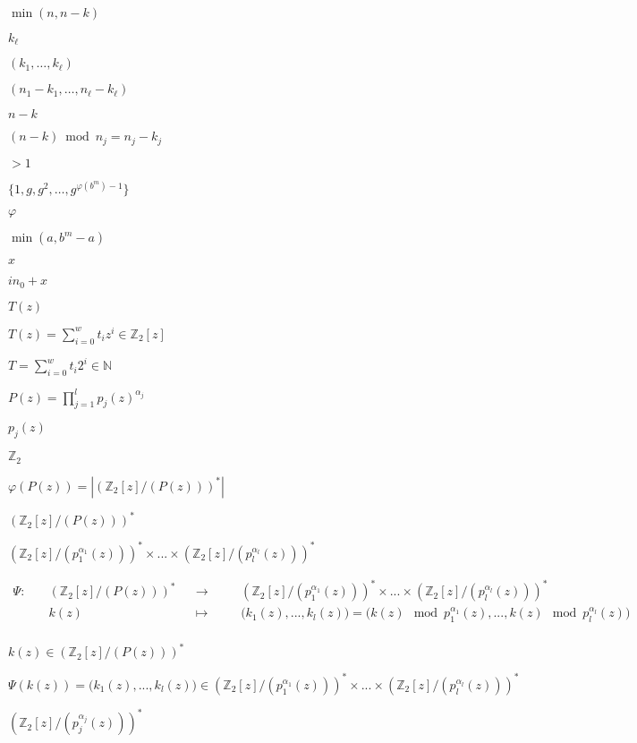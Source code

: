 \documentclass{article}
\begin{document}
$\min(n,n-k)$
\pagebreak

$k_\ell$
\pagebreak

$(k_1,
 \dots, k_\ell)$
\pagebreak

$(n_1 - k_1, \dots, n_\ell -
 k_\ell)$
\pagebreak

$n - k$
\pagebreak

$(n - k) \bmod n_j = n_j - k_j$
\pagebreak

$>1$
\pagebreak

$\{ 1, g, g^2, \dots, g^{\varphi(b^m) - 1} \}$
\pagebreak

$\varphi$
\pagebreak

$\min(a, b^m - a)$
\pagebreak

$x$
\pagebreak

$i n_0 + x$
\pagebreak

$T(z)$
\pagebreak

$T(z)=\sum_{i=0}^{w} t_{i}z^i \in \mathbb{Z}_{2}[z]$
\pagebreak

$T = \sum_{i=0}^{w} t_{i}2^i \in \mathbb{N}$
\pagebreak

$P(z) = \prod_{j=1}^{l} p_{j}(z)^{\alpha_{j}}$
\pagebreak

$p_{j}(z)$
\pagebreak

$\mathbb{Z}_{2}$
\pagebreak

$\varphi(P(z)) = \left | (\mathbb{Z}_{2}[z]/(P(z)))^{*} \right |$
\pagebreak

$(\mathbb{Z}_{2}[z]/(P(z)))^{*}$
\pagebreak

$(\mathbb{Z}_{2}[z]/(p_{1}^{\alpha_{1}}(z)))^{*}\times...\times (\mathbb{Z}_{2}[z]/(p_{l}^{\alpha_{l}}(z)))^{*}$
\pagebreak

\begin{eqnarray*}\Psi :\quad &(\mathbb{Z}_{2}[z]/(P(z)))^{*} &&\longrightarrow \quad && (\mathbb{Z}_{2}[z]/(p_{1}^{\alpha_{1}}(z)))^{*}\times...\times (\mathbb{Z}_{2}[z]/(p_{l}^{\alpha_{l}}(z)))^{*}\\
& k(z) &&\longmapsto &&\big(k_{1}(z),...,k_{l}(z)\big) = \big(k(z) \mod  p_{1}^{\alpha_{1}}(z),...,k(z) \mod  p_{l}^{\alpha_{l}}(z)\big) \\
\end{eqnarray*}
\pagebreak

$k(z) \in (\mathbb{Z}_{2}[z]/(P(z)))^{*}$
\pagebreak

$\Psi(k(z)) = \big(k_{1}(z),...,k_{l}(z)\big)  \in (\mathbb{Z}_{2}[z]/(p_{1}^{\alpha_{1}}(z)))^{*}\times...\times (\mathbb{Z}_{2}[z]/(p_{l}^{\alpha_{l}}(z)))^{*}$
\pagebreak

$(\mathbb{Z}_{2}[z]/(p_{j}^{\alpha_{j}}(z)))^{*}$
\pagebreak
\end{document}

